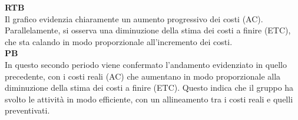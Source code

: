 \begin{flushleft}
\textbf{RTB} \\
Il grafico evidenzia chiaramente un aumento progressivo dei costi (AC). Parallelamente, si osserva una diminuzione della stima dei costi a finire (ETC), che sta calando in modo proporzionale all'incremento dei costi. \\
\textbf{PB} \\
In questo secondo periodo viene confermato l'andamento evidenziato in quello precedente, con i costi reali (AC) che aumentano in modo proporzionale alla diminuzione della stima dei costi a finire (ETC). Questo indica che il gruppo ha svolto le attività in modo efficiente, con un allineamento tra i costi reali e quelli preventivati.
\end{flushleft}

\newpage
